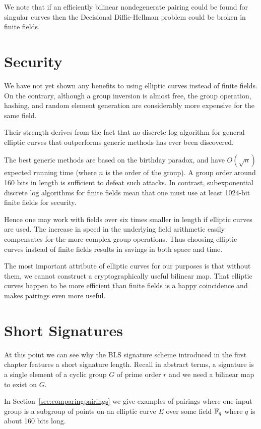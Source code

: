 We note that if an efficiently bilinear nondegenerate pairing could be found
for singular curves then the Decisional Diffie-Hellman problem could be broken
in finite fields.

\section {\label{sec:eccsec}Security}

We have not yet shown any benefits to using elliptic curves instead
of finite fields. On the contrary, although a group inversion is
almost free, the group operation, hashing, and random element generation
are considerably more expensive for the same field.

Their strength derives from the fact that no discrete log algorithm for
general elliptic curves that outperforms generic methods has ever been
discovered.

The best generic methods are based on the birthday paradox, and have
$O(\sqrt{n})$ expected running time (where $n$ is the order of the group).
A group order around 160 bits in length is sufficient to defeat such attacks.
In contrast, subexponential discrete log algorithms for finite fields
mean that one must use at least 1024-bit finite fields for security.

Hence one may work with fields over six times smaller in length
if elliptic curves are used. The increase in speed in
the underlying field arithmetic easily compensates for the more
complex group operations. Thus choosing elliptic curves instead of
finite fields results in savings in both space and time.

The most important attribute of elliptic curves for our purposes
is that without them, we cannot construct a cryptographically
useful bilinear map. That elliptic curves happen to be more
efficient than finite fields
is a happy coincidence and makes pairings even more useful.

\section {Short Signatures}

At this point we can see why
the BLS signature scheme introduced
in the first chapter features a short signature length.
Recall in abstract terms,
a signature is a single element of a cyclic group $G$ of prime order $r$
and we need a bilinear map to exist on $G$.

In Section~\ref{sec:comparingpairings} we give examples
of pairings where one input group is a subgroup of points
on an elliptic curve $E$ over some field $\mathbb{F}_q$ where
$q$ is about 160 bits long.

